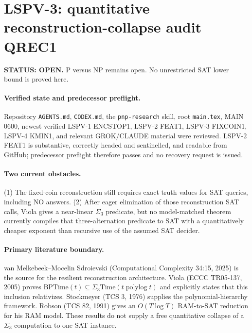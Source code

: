 \documentclass[11pt]{article}
\begin{document}
\section*{LSPV-3: quantitative reconstruction-collapse audit QREC1}
\textbf{STATUS: OPEN.} P versus NP remains open. No unrestricted SAT lower bound is proved here.

\paragraph{Verified state and predecessor preflight.}
Repository \texttt{AGENTS.md}, \texttt{CODEX.md}, the \texttt{pnp-research} skill, root \texttt{main.tex}, MAIN 0600, newest verified LSPV-1 ENCSTOP1, LSPV-2 FEAT1, LSPV-3 FIXCOIN1, LSPV-4 KMIN1, and relevant GROK/CLAUDE material were reviewed. LSPV-2 FEAT1 is substantive, correctly headed and sentinelled, and readable from GitHub; predecessor preflight therefore passes and no recovery request is issued.

\paragraph{Two current obstacles.}
(1) The fixed-coin reconstruction still requires exact truth values for SAT queries, including NO answers.  (2) After eager elimination of those reconstruction SAT calls, Viola gives a near-linear $\Sigma_3$ predicate, but no model-matched theorem currently compiles that three-alternation predicate to SAT with a quantitatively cheaper exponent than recursive use of the assumed SAT decider.

\paragraph{Primary literature boundary.}
van Melkebeek--Mocelin Sdroievski (Computational Complexity 34:15, 2025) is the source for the resilient reconstruction architecture. Viola (ECCC TR05-137, 2005) proves $\mathrm{BPTime}(t)\subseteq\Sigma_3\mathrm{Time}(t\operatorname{polylog}t)$ and explicitly states that this inclusion relativizes. Stockmeyer (TCS 3, 1976) supplies the polynomial-hierarchy framework. Robson (TCS 82, 1991) gives an $O(T\log T)$ RAM-to-SAT reduction for his RAM model. These results do not supply a free quantitative collapse of a $\Sigma_3$ computation to one SAT instance.
\end{document}
